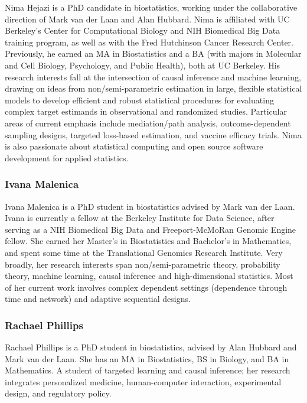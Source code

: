 \documentclass[12pt, krantz2,]{krantz}
\theoremstyle{definition}
\theoremstyle{definition}
\theoremstyle{definition}
\newcommand{\1}{\mathbbm{1}}
\begin{document}
Nima Hejazi is a PhD candidate in biostatistics, working under the collaborative
direction of Mark van der Laan and Alan Hubbard. Nima is affiliated with UC
Berkeley's Center for Computational Biology and NIH Biomedical Big Data training
program, as well as with the Fred Hutchinson Cancer Research Center. Previously,
he earned an MA in Biostatistics and a BA (with majors in Molecular and Cell
Biology, Psychology, and Public Health), both at UC Berkeley. His research
interests fall at the intersection of causal inference and machine learning,
drawing on ideas from non/semi-parametric estimation in large, flexible
statistical models to develop efficient and robust statistical procedures for
evaluating complex target estimands in observational and randomized studies.
Particular areas of current emphasis include mediation/path analysis,
outcome-dependent sampling designs, targeted loss-based estimation, and vaccine
efficacy trials. Nima is also passionate about statistical computing and open
source software development for applied statistics.

\hypertarget{ivana-malenica}{%
\subsubsection*{Ivana Malenica}\label{ivana-malenica}}


Ivana Malenica is a PhD student in biostatistics advised by Mark van der Laan.
Ivana is currently a fellow at the Berkeley Institute for Data Science, after
serving as a NIH Biomedical Big Data and Freeport-McMoRan Genomic Engine fellow.
She earned her Master's in Biostatistics and Bachelor's in Mathematics, and
spent some time at the Translational Genomics Research Institute. Very broadly,
her research interests span non/semi-parametric theory, probability theory,
machine learning, causal inference and high-dimensional statistics. Most of her
current work involves complex dependent settings (dependence through time and
network) and adaptive sequential designs.

\hypertarget{rachael-phillips}{%
\subsubsection*{Rachael Phillips}\label{rachael-phillips}}


Rachael Phillips is a PhD student in biostatistics, advised by Alan Hubbard and
Mark van der Laan. She has an MA in Biostatistics, BS in Biology, and BA in
Mathematics. A student of targeted learning and causal inference; her research
integrates personalized medicine, human-computer interaction, experimental
design, and regulatory policy.
\end{document}
